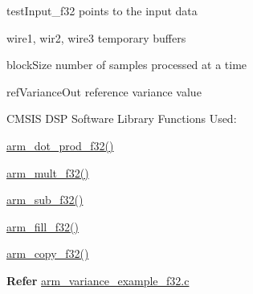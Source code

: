 \begin{DoxyParagraph}{}
\begin{DoxyItemize}
\item {\ttfamily test\-Input\-\_\-f32} points to the input data \item {\ttfamily wire1}, {\ttfamily wir2}, {\ttfamily wire3} temporary buffers \item {\ttfamily block\-Size} number of samples processed at a time \item {\ttfamily ref\-Variance\-Out} reference variance value\end{DoxyItemize}

\end{DoxyParagraph}
\begin{DoxyParagraph}{C\-M\-S\-I\-S D\-S\-P Software Library Functions Used\-:}

\end{DoxyParagraph}
\begin{DoxyParagraph}{}

\begin{DoxyItemize}
\item \hyperlink{group__dot__prod_ga55418d4362f6ba84c327f9b4f089a8c3}{arm\-\_\-dot\-\_\-prod\-\_\-f32()}
\item \hyperlink{group___basic_mult_gaca3f0b8227da431ab29225b88888aa32}{arm\-\_\-mult\-\_\-f32()}
\item \hyperlink{group___basic_sub_ga7f975a472de286331134227c08aad826}{arm\-\_\-sub\-\_\-f32()}
\item \hyperlink{group___fill_ga2248e8d3901b4afb7827163132baad94}{arm\-\_\-fill\-\_\-f32()}
\item \hyperlink{group__copy_gadd1f737e677e0e6ca31767c7001417b3}{arm\-\_\-copy\-\_\-f32()}
\end{DoxyItemize}
\end{DoxyParagraph}
{\bfseries  Refer } \hyperlink{arm_variance_example_f32_8c-example}{arm\-\_\-variance\-\_\-example\-\_\-f32.\-c} 